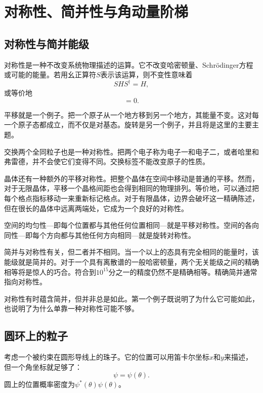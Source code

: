 \chapter{对称性、简并性与角动量阶梯}
\providecommand{\ket}[1]{\left\lvert#1\right\rangle}

\section{对称性与简并能级}

对称性是一种不改变系统物理描述的运算。它不改变哈密顿量、Schr\"odinger方程或可能的能量。若用幺正算符\(S\)表示该运算，则不变性意味着
\begin{equation}
S H S^\dagger=H,
\end{equation}
或等价地
\begin{equation}
[S,H]=0.
\end{equation}

平移就是一个例子。把一个原子从一个地方移到另一个地方，其能量不变。这对每一个原子态都成立，而不仅是对基态。旋转是另一个例子，并且将是这里的主要主题。

交换两个全同粒子也是一种对称性。把两个电子称为电子一和电子二，或者哈里和弗雷德，并不会使它们变得不同。交换标签不能改变原子的性质。

晶体还有一种额外的平移对称性。把整个晶体在空间中移动是普通的平移。然而，对于无限晶体，平移一个晶格间距也会得到相同的物理排列。等价地，可以通过把每个格点指标移动一来重新标记格点。对于有限晶体，边界会破坏这一精确陈述，但在很长的晶体中远离两端处，它成为一个良好的对称性。

空间的均匀性---即每个位置都与其他任何位置相同---就是平移对称性。空间的各向同性---即每个方向都与其他任何方向相同---就是旋转对称性。

简并与对称性有关，但二者并不相同。当一个以上的态具有完全相同的能量时，该能级就是简并的。对于一个具有离散谱的一般哈密顿量，两个无关能级之间的精确相等将是惊人的巧合。符合到\(10^{15}\)分之一的精度仍然不是精确相等。精确简并通常指向对称性。

对称性有时蕴含简并，但并非总是如此。第一个例子既说明了为什么它可能如此，也说明了为什么单靠一种对称性可能不够。

\section{圆环上的粒子}

考虑一个被约束在圆形导线上的珠子。它的位置可以用笛卡尔坐标\(x\)和\(y\)来描述，但一个角坐标就足够了：
\begin{equation}
\psi=\psi(\theta).
\end{equation}
圆上的位置概率密度为\(\psi^*(\theta)\psi(\theta)\)。

